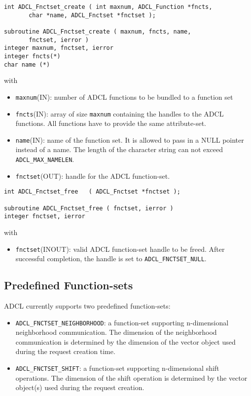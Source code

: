 \hspace{1cm}
\begin{verbatim}
int ADCL_Fnctset_create ( int maxnum, ADCL_Function *fncts, 
       char *name, ADCL_Fnctset *fnctset );

subroutine ADCL_Fnctset_create ( maxnum, fncts, name, 
       fnctset, ierror )
integer maxnum, fnctset, ierror
integer fncts(*)
char name (*)
\end{verbatim}
with
\begin{itemize}
\item {\tt maxnum}(IN): number of ADCL functions to be bundled to a function set
\item {\tt fncts}(IN): array of size {\tt maxnum} containing the handles to the ADCL functions. All functions have to provide
	  the same attribute-set.
\item {\tt name}(IN): name of the function set. It is allowed to pass in a NULL pointer instead of a name. The length of the character string can not exceed {\tt ADCL\_MAX\_NAMELEN}.
\item {\tt fnctset}(OUT): handle for the ADCL function-set.
\end{itemize}

\hspace{1cm}
\begin{verbatim}
int ADCL_Fnctset_free   ( ADCL_Fnctset *fnctset );

subroutine ADCL_Fnctset_free ( fnctset, ierror )
integer fnctset, ierror
\end{verbatim}
with
\begin{itemize}
\item {\tt fnctset}(INOUT): valid ADCL function-set handle to be freed. After successful completion, the handle is set to {\tt ADCL\_FNCTSET\_NULL}.
\end{itemize}


\pagebreak
\subsection{Predefined Function-sets}
\label{fnctset-predef}

ADCL currently supports two predefined function-sets: 
\begin{itemize}
\item {\tt ADCL\_FNCTSET\_NEIGHBORHOOD}: a function-set supporting n-dimensional neighborhood communication. The dimension
	of the neighborhood communication is determined by the dimension of the vector object used during the request creation time.
\item {\tt ADCL\_FNCTSET\_SHIFT}: a function-set supporting n-dimensional shift operations. The dimension of the shift operation is determined by the vector object(s) used during the request creation.
\end{itemize}

